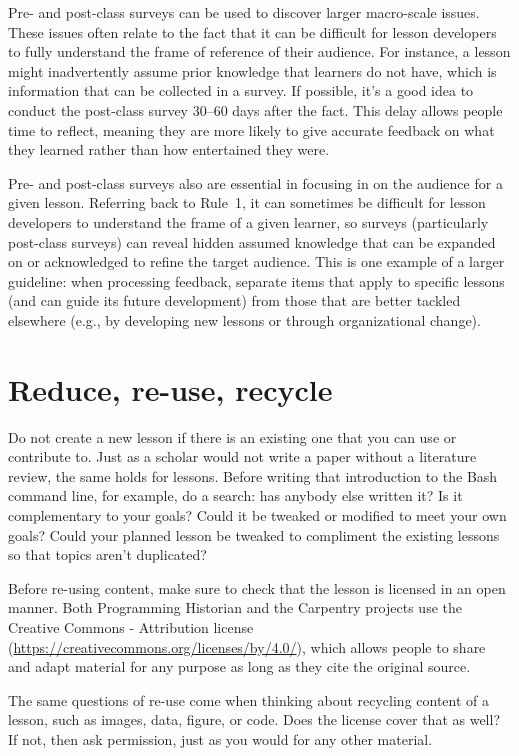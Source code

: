 \documentclass[10pt,letterpaper]{article}
\newcommand{\rulemajor}[1]{\section{#1}}
\begin{document}
Pre- and post-class surveys can be used to discover larger macro-scale issues.
These issues often relate to the fact that it can be difficult for lesson developers
to fully understand the frame of reference of their audience.
For instance, a lesson might inadvertently assume prior knowledge that learners do not have,
which is information that can be collected in a survey.
If possible, it's a good idea to conduct the post-class survey 30--60 days after the fact.
This delay allows people time to reflect,
meaning they are more likely to give accurate feedback on what they learned
rather than how entertained they were.

Pre- and post-class surveys also are essential in focusing in on the audience for a given lesson.
Referring back to Rule~1,
it can sometimes be difficult for lesson developers to understand the frame of a given learner,
so surveys (particularly post-class surveys) can reveal hidden assumed knowledge
that can be expanded on or acknowledged to refine the target audience.
This is one example of a larger guideline:
when processing feedback,
separate items that apply to specific lessons (and can guide its future development)
from those that are better tackled elsewhere
(e.g., by developing new lessons or through organizational change).

\rulemajor{Reduce, re-use, recycle}

Do not create a new lesson if there is an existing one that you can use or contribute to.
Just as a scholar would not write a paper without a literature review,
the same holds for lessons.
Before writing that introduction to the Bash command line,
for example,
do a search:
has anybody else written it?
Is it complementary to your goals?
Could it be tweaked or modified to meet your own goals?
Could your planned lesson be tweaked to compliment the existing lessons so that topics aren't duplicated?

Before re-using content,
make sure to check that the lesson is licensed in an open manner.
Both Programming Historian and the Carpentry projects
use the Creative Commons - Attribution license
(\url{https://creativecommons.org/licenses/by/4.0/}),
which allows people to share and adapt material for any purpose
as long as they cite the original source.

The same questions of re-use come when thinking about recycling content of a lesson,
such as images, data, figure, or code.
Does the license cover that as well?
If not,
then ask permission,
just as you would for any other material.
\end{document}
